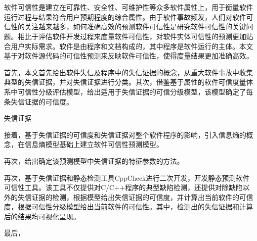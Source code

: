 \vspace{-2.5cm}
\chapter*{}
\vspace{-1cm}

\setlength{\baselineskip}{25pt}
软件可信性是建立在可靠性、安全性、可维护性等众多软件属性上，用于衡量软件运行过程与结果符合用户预期程度的综合属性。由于软件事故频发，人们对软件可信性的关注越来越多，如何准确高效的预测软件可信性是研究软件可信性的关键问题。相比于评估软件开发过程来度量软件可信性，对软件实体可信性的预测更加贴合用户实际需求。软件是由程序和文档构成的，其中程序是软件运行的主体。本文基于对软件源代码的可信性预测来反映软件可信性，使得度量结果更加准确高效。

首先，本文首先给出软件失信及程序中的失信证据的概念，从重大软件事故中收集典型的失信证据，并对失信证据进行分类。其次，借鉴基于属性的软件可信度量体系中可信性分级评估模型，给出适用于失信证据的可信分级模型，该模型确定了每条失信证据的可信度。

失信证据

接着，基于失信证据的可信度和失信证据对整个软件程序的影响，引入信息熵的概念，在信息熵模型基础上建立软件可信性预测模型。

再次，给出确定该预测模型中失信证据的特征参数的方法。

再次，基于失信证据和静态检测工具CppCheck进行二次开发，开发静态预测软件可信性工具。该工具不仅提供对C/C++程序的典型缺陷检测，还提供对除缺陷以外的失信证据的检测，根据模型给出失信证据的可信度，并计算出当前软件的可信度，根据可信性分级模型给出当前软件的可信性。其中，检测出的失信证据和计算后的结果均可视化呈现。

最后，

\hspace{-0.5cm}
 
